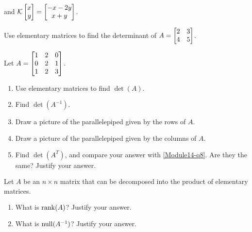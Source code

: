 \begin{exercises}
\begin{problist}
\begin{enumerate}
			and $\mathcal K\mat{x\\y}=\matc{-x-2y\\x+y}$.
        \end{enumerate}
        
        \prob Use elementary matrices to find the determinant of $A=\mat{2&3\\4&5}$.
        
        \prob Let $A=\mat{1&2&0\\0&2&1\\1&2&3}$.
        \begin{enumerate}
			\item \label{Module14-q8}   Use elementary matrices to find $\det(A)$.
			\item  	Find $\det(A^{-1})$.
			\item   Draw a picture of the parallelepiped given by the rows of $A$.
			\item  	Draw a picture of the parallelepiped given by the columns of $A$.
			\item   Find $\det(A^{T})$, and compare your answer with \ref{Module14-q8}. Are they the same? Justify your answer.
        \end{enumerate}
        
        \prob Let $A$ be an $n \times n$ matrix that can be decomposed into the product of elementary matrices. 
        \begin{enumerate}
			\item   What is $\operatorname{rank}(A)$?         Justify your answer.
			\item  	What is $\operatorname{null}(A^{-1})$?         Justify your answer.
        \end{enumerate}
		
	\end{problist}
\end{exercises}
